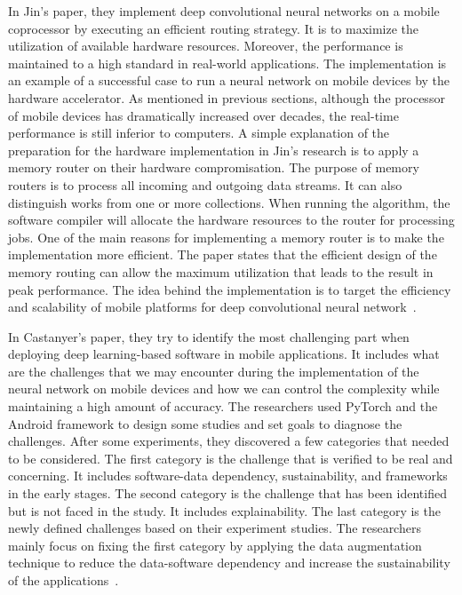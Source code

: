 \documentclass{article}
\begin{document}
In Jin's paper, they implement deep convolutional neural networks on a mobile coprocessor by executing an efficient routing strategy. It is to maximize the utilization of available hardware resources. Moreover, the performance is maintained to a high standard in real-world applications. The implementation is an example of a successful case to run a neural network on mobile devices by the hardware accelerator. As mentioned in previous sections, although the processor of mobile devices has dramatically increased over decades, the real-time performance is still inferior to computers. A simple explanation of the preparation for the hardware implementation in Jin's research is to apply a memory router on their hardware compromisation. The purpose of memory routers is to process all incoming and outgoing data streams. It can also distinguish works from one or more collections. When running the algorithm, the software compiler will allocate the hardware resources to the router for processing jobs. One of the main reasons for implementing a memory router is to make the implementation more efficient. The paper states that the efficient design of the memory routing can allow the maximum utilization that leads to the result in peak performance. The idea behind the implementation is to target the efficiency and scalability of mobile platforms for deep convolutional neural network~\cite{6908370}.

In Castanyer's paper, they try to identify the most challenging part when deploying deep learning-based software in mobile applications. It includes what are the challenges that we may encounter during the implementation of the neural network on mobile devices and how we can control the complexity while maintaining a high amount of accuracy. The researchers used PyTorch and the Android framework to design some studies and set goals to diagnose the challenges. After some experiments, they discovered a few categories that needed to be considered. The first category is the challenge that is verified to be real and concerning. It includes software-data dependency, sustainability, and frameworks in the early stages. The second category is the challenge that has been identified but is not faced in the study. It includes explainability. The last category is the newly defined challenges based on their experiment studies. The researchers mainly focus on fixing the first category by applying the data augmentation technique to reduce the data-software dependency and increase the sustainability of the applications~\cite{cast2020integration}.



\small

% 
  
\end{document}
